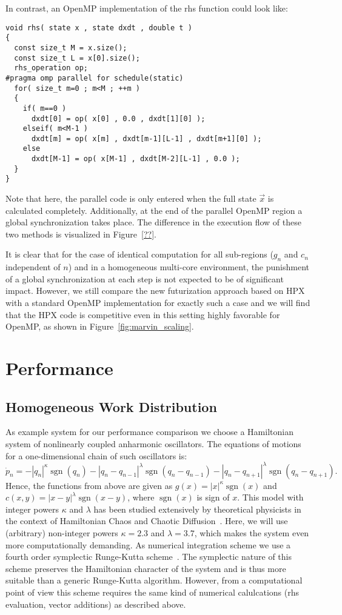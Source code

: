 \documentclass[10pt]{scrartcl}
\newcommand{\sgn}{\operatorname{sgn}}
\begin{document}
In contrast, an OpenMP implementation of the rhs function could look like:
\begin{lstlisting}
void rhs( state x , state dxdt , double t )
{
  const size_t M = x.size();
  const size_t L = x[0].size();
  rhs_operation op;
#pragma omp parallel for schedule(static)
  for( size_t m=0 ; m<M ; ++m )
  {
    if( m==0 )
      dxdt[0] = op( x[0] , 0.0 , dxdt[1][0] );
    elseif( m<M-1 )
      dxdt[m] = op( x[m] , dxdt[m-1][L-1] , dxdt[m+1][0] );
    else
      dxdt[M-1] = op( x[M-1] , dxdt[M-2][L-1] , 0.0 );
  }
}
\end{lstlisting}
Note that here, the parallel code is only entered when the full state $\vec x$ is calculated completely.
Additionally, at the end of the parallel OpenMP region a global synchronization takes place.
The difference in the execution flow of these two methods is visualized in Figure~\ref{??}.

It is clear that for the case of identical computation for all sub-regions ($g_n$ and $c_n$ independent of $n$) and in a homogeneous multi-core environment, the punishment of a global synchronization at each step is not expected to be of significant impact.
However, we still compare the new futurization approach based on HPX with a standard OpenMP implementation for exactly such a case and we will find that the HPX code is competitive even in this setting highly favorable for OpenMP, as shown in Figure~\ref{fig:marvin_scaling}.

\section{Performance}

\subsection{Homogeneous Work Distribution}

As example system for our performance comparison we choose a Hamiltonian system of nonlinearly coupled anharmonic oscillators.
The equations of motions for a one-dimensional chain of such oscillators is:
\begin{equation}
 \dot p_n = -|q_n|^\kappa\sgn(q_n) - |q_n-q_{n-1}|^\lambda\sgn(q_n-q_{n-1}) - |q_n-q_{n+1}|^\lambda\sgn(q_n-q_{n+1}).
\end{equation} 
Hence, the functions from above are given as $g(x) = |x|^\kappa\sgn(x)$ and $c(x,y)=|x-y|^\lambda\sgn(x-y)$, where $\sgn(x)$ is sign of $x$.
This model with integer powers $\kappa$ and $\lambda$ has been studied extensively by theoretical physicists in the context of Hamiltonian Chaos and Chaotic Diffusion~\cite{blabla}.
Here, we will use (arbitrary) non-integer powers $\kappa=2.3$ and $\lambda=3.7$, which makes the system even more computationally demanding.
As numerical integration scheme we use a fourth order symplectic Runge-Kutta scheme~\cite{mclachlan}.
The symplectic nature of this scheme preserves the Hamiltonian character of the system and is thus more suitable than a generic Runge-Kutta algorithm.
However, from a computational point of view this scheme requires the same kind of numerical calulcations (rhs evaluation, vector additions) as described above.
\end{document}
